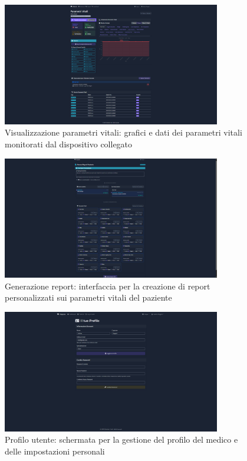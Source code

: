 \documentclass[12pt,a4paper,oneside]{report}
\begin{document}
\begin{figure}[H]
    \centering
    \includegraphics[width=0.85\textwidth]{images/screen/vitals.png}
    \caption{Visualizzazione parametri vitali: grafici e dati dei parametri vitali monitorati dal dispositivo collegato}
    \label{fig:vitals}
\end{figure}

\begin{figure}[H]
    \centering
    \includegraphics[width=0.85\textwidth]{images/screen/report.png}
    \caption{Generazione report: interfaccia per la creazione di report personalizzati sui parametri vitali del paziente}
    \label{fig:report}
\end{figure}

\begin{figure}[H]
    \centering
    \includegraphics[width=0.85\textwidth]{images/screen/profile.png}
    \caption{Profilo utente: schermata per la gestione del profilo del medico e delle impostazioni personali}
    \label{fig:profile}
\end{figure}
\end{document}

